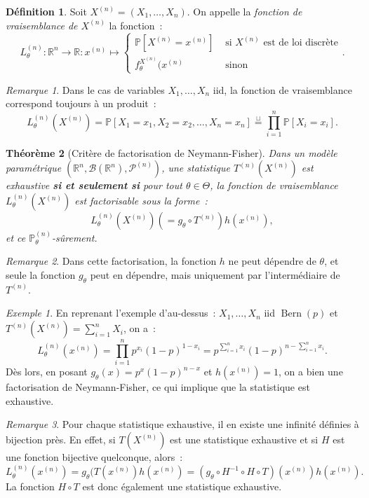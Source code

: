 \documentclass{report}
\DeclareMathOperator{\Bern}{Bern}  %
\renewcommand{\P}{\mathbb P}
\newcommand{\statmod}[4]{\left(#1^{#4}, #2\left(#1^{#4}\right), #3^{\left(#4\right)}\right)}
\newcommand{\R}{\mathbb R}
\newcommand{\Brl}{\mathcal B}  %
\newtheorem{thm}{Théorème}[chapter]
\theoremstyle{definition}
\newtheorem{déf}[thm]{Définition}
\theoremstyle{remark}
\newtheorem*{rmq}{Remarque}
\newtheorem{ex}{Exemple}[chapter]
\begin{document}
		\begin{déf} Soit $X^{(n)} = (X_1, \ldots, X_n)$. On appelle la \textit{fonction de vraisemblance de $X^{(n)}$} la fonction~:
		\[L_\theta^{(n)} : \R^n \to \R : x^{(n)} \mapsto \begin{cases}\P[X^{(n)}
			= x^{(n)}] &\text{ si $X^{(n)}$ est de loi discrète} \\f_\theta^{X^{(n)}}(x^{(n)} &\text{ sinon}\end{cases}.\]
		\end{déf}

		\begin{rmq} Dans le cas de variables $X_1, \ldots, X_n$ iid, la fonction de vraisemblance correspond toujours à un produit~:
		\[L_\theta^{(n)}(X^{(n)}) = \P[X_1 = x_1, X_2 = x_2, \ldots, X_n = x_n] \overset \sqcup= \prod_{i=1}^n\P[X_i = x_i].\]
		\end{rmq}

		\begin{thm}[Critère de factorisation de Neymann-Fisher] Dans un modèle paramétrique $\statmod \R\Brl{\mathcal P}n$, une statistique $T^{(n)}(X^{(n)})$ est
		exhaustive \textbf{si et seulement si} pour tout $\theta \in \Theta$, la fonction de vraisemblance $L_\theta^{(n)}(X^{(n)})$ est factorisable sous la forme~:
		\[L_\theta^{(n)}(X^{(n)}) \left(= g_\theta \circ T^{(n)}\right) h(x^{(n)}),\]
		et ce $\P_\theta^{(n)}$-sûrement.
		\end{thm}

		\begin{rmq} Dans cette factorisation, la fonction $h$ ne peut dépendre de $\theta$, et seule la fonction $g_\theta$ peut en dépendre, mais uniquement par
		l'intermédiaire de $T^{(n)}$.
		\end{rmq}

		\begin{ex} En reprenant l'exemple d'au-dessus~: $X_1, \ldots, X_n$ iid $\Bern(p)$ et $T^{(n)}(X^{(n)}) = \sum_{i=1}^nX_i$, on a~:
		\[L_\theta^{(n)}(x^{(n)}) = \prod_{i=1}^np^{x_i}(1-p)^{1-x_i} = p^{\sum_{i=1}^nx_i}(1-p)^{n - \sum_{i=1}^nx_i}.\]
		Dès lors, en posant $g_\theta(x) = p^x(1-p)^{n-x}$ et $h(x^{(n)}) = 1$, on a bien une factorisation de Neymann-Fisher, ce qui implique que la statistique
		est exhaustive.
		\end{ex}

		\begin{rmq} Pour chaque statistique exhaustive, il en existe une infinité définies à bijection près. En effet, si $T(X^{(n)})$ est une statistique exhaustive
		et si $H$ est une fonction bijective quelconque, alors~:
		\[L_\theta^{(n)}(x^{(n)}) = g_\theta(T(x^{(n)})h(x^{(n)}) = (g_\theta \circ H^{-1} \circ H \circ T)(x^{(n)})h(x^{(n)}).\]
		La fonction $H \circ T$ est donc également une statistique exhaustive.
		\end{rmq}
\end{document}
